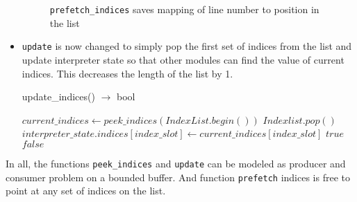 \begin{itemize}
\begin{figure}[h]
    \caption{\texttt{prefetch\_indices} saves mapping of line number to position in the list} \label{fig:prefetch_indices map}
  \end{figure}

\item \texttt{update} is now changed to simply pop the first set of indices from
  the list and update interpreter state so that other modules can find the value
  of current indices. This decreases the length of the list by 1.
  \begin{algorithm}  {update\_indices() $\rightarrow$ bool}
    \singlespacing

    \begin{algorithmic}[1]
      \State $current\_indices \gets peek\_indices(IndexList.begin())$
      \State $Indexlist.pop()$
      \State $interpreter\_state.indices[index\_slot] \gets current\_indices[index\_slot]$
      \EndFor
      \State \Return $true$
      \Else
      \State \Return $false$
      \EndIf
      \EndFunction
    \end{algorithmic}
  \end{algorithm}
\end{itemize}

In all, the functions \texttt{peek\_indices} and \texttt{update} can be modeled
as producer and consumer problem on a bounded buffer. And function \texttt{prefetch}
indices is free to point at any set of indices on the list.

